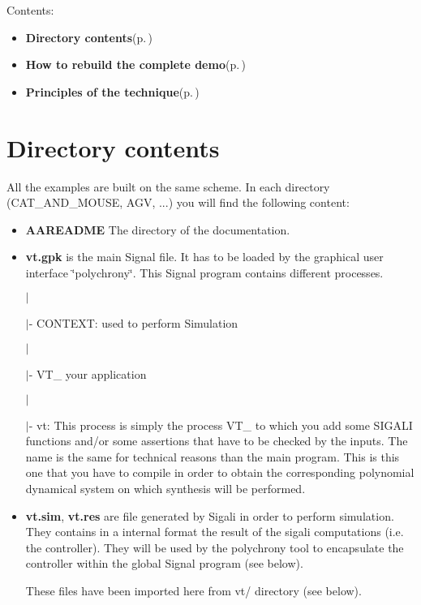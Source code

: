 Contents:\begin{itemize}
\item {\bf Directory contents}{\rm (p.\,\pageref{index_sectA})}\item {\bf How to rebuild the complete demo}{\rm (p.\,\pageref{index_sectB})}\item {\bf Principles of the technique}{\rm (p.\,\pageref{index_sectC})}\end{itemize}
\section{Directory contents}\label{index_sectA}
All the examples are built on the same scheme. In each directory (CAT\_\-AND\_\-MOUSE, AGV, ...) you will find the following content:

\begin{itemize}
\item {\bf AAREADME} The directory of the documentation.\end{itemize}


\begin{itemize}
\item {\bf vt.gpk} is the main Signal file. It has to be loaded by the graphical user interface \char`\"{}polychrony\char`\"{}. This Signal program contains different processes. \par
 $|$\par
 $|$- CONTEXT: used to perform Simulation \par
 $|$\par
 $|$- VT\_ your application\par
 $|$\par
 $|$- vt: This process is simply the process VT\_ to which you add some SIGALI functions and/or some assertions that have to be checked by the inputs. The name is the same for technical reasons than the main program. This is this one that you have to compile in order to obtain the corresponding polynomial dynamical system on which synthesis will be performed.\end{itemize}


\begin{itemize}
\item {\bf vt.sim}, {\bf vt.res} are file generated by Sigali in order to perform simulation. They contains in a internal format the result of the sigali computations (i.e. the controller). They will be used by the polychrony tool to encapsulate the controller within the global Signal program (see below). \par
 These files have been imported here from vt/ directory (see below).\end{itemize}


